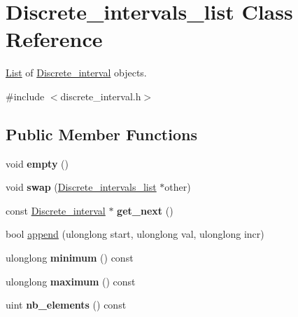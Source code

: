 \hypertarget{classDiscrete__intervals__list}{}\section{Discrete\+\_\+intervals\+\_\+list Class Reference}
\label{classDiscrete__intervals__list}


\mbox{\hyperlink{classList}{List}} of \mbox{\hyperlink{classDiscrete__interval}{Discrete\+\_\+interval}} objects.  




{\ttfamily \#include $<$discrete\+\_\+interval.\+h$>$}

\subsection*{Public Member Functions}
\begin{DoxyCompactItemize}
\item 
\mbox{\label{classDiscrete__intervals__list_aa6cba52a1759c6b105bcdae20218eacf}} 
void {\bfseries empty} ()
\item 
\mbox{\label{classDiscrete__intervals__list_ac235b82d62a5c02f60a81e1b06708c35}} 
void {\bfseries swap} (\mbox{\hyperlink{classDiscrete__intervals__list}{Discrete\+\_\+intervals\+\_\+list}} $\ast$other)
\item 
\mbox{\label{classDiscrete__intervals__list_aa798d8d1cc81ac264fc8ef9da296eff7}} 
const \mbox{\hyperlink{classDiscrete__interval}{Discrete\+\_\+interval}} $\ast$ {\bfseries get\+\_\+next} ()
\item 
bool \mbox{\hyperlink{classDiscrete__intervals__list_a265c2726cfcc9d3a9349a914136583e7}{append}} (ulonglong start, ulonglong val, ulonglong incr)
\item 
\mbox{\label{classDiscrete__intervals__list_aa6abff5383bf9cc46aa98ddc2b6b4d31}} 
ulonglong {\bfseries minimum} () const
\item 
\mbox{\label{classDiscrete__intervals__list_a0245308f67356d0f840cb8ea9252378a}} 
ulonglong {\bfseries maximum} () const
\item 
\mbox{\label{classDiscrete__intervals__list_a02b24c376c78a157b8bd8102a5c530fc}} 
uint {\bfseries nb\+\_\+elements} () const
\end{DoxyCompactItemize}


